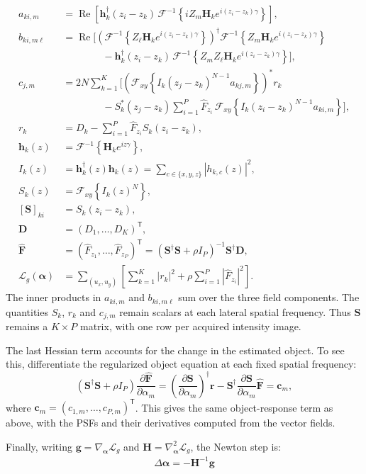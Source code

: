 \documentclass{article}
\begin{document}
\begin{align*}
a_{ki,m}
&=
\operatorname{Re}\left[
\mathbf h_k^\dagger(z_i-z_k)\,
\mathcal F^{-1}
\left\{
iZ_m\mathbf H_k e^{i(z_i-z_k)\gamma}
\right\}
\right],
\\[6pt]
b_{ki,m\ell}
&=
\operatorname{Re}\Bigg[
\left(
\mathcal F^{-1}
\left\{
Z_\ell\mathbf H_k e^{i(z_i-z_k)\gamma}
\right\}
\right)^\dagger
\mathcal F^{-1}
\left\{
Z_m\mathbf H_k e^{i(z_i-z_k)\gamma}
\right\}
\\
&\qquad\qquad-
\mathbf h_k^\dagger(z_i-z_k)\,
\mathcal F^{-1}
\left\{
Z_mZ_\ell\mathbf H_k e^{i(z_i-z_k)\gamma}
\right\}
\Bigg],
\\[6pt]
c_{j,m}
&=
2N\sum_{k=1}^{K}\Bigg[
\left(
\mathcal F_{xy}
\left\{
I_k(z_j-z_k)^{N-1}a_{kj,m}
\right\}
\right)^*r_k
\\
&\qquad\qquad-
S_k^*(z_j-z_k)
\sum_{i=1}^{P}\widehat F_{z_i}\,
\mathcal F_{xy}
\left\{
I_k(z_i-z_k)^{N-1}a_{ki,m}
\right\}
\Bigg],
\\[6pt]
r_k
&=
D_k-\sum_{i=1}^{P}\widehat F_{z_i}S_k(z_i-z_k),
\\[6pt]
\mathbf h_k(z)
&=
\mathcal F^{-1}\left\{\mathbf H_k e^{iz\gamma}\right\},
\\[6pt]
I_k(z)
&=
\mathbf h_k^\dagger(z)\mathbf h_k(z)
=\sum_{c\in\{x,y,z\}}|h_{k,c}(z)|^2,
\\[6pt]
S_k(z)
&=
\mathcal F_{xy}\left\{I_k(z)^N\right\},
\\[6pt]
[\mathbf S]_{ki}
&=
S_k(z_i-z_k),
\\[6pt]
\mathbf D
&=
(D_1,\ldots,D_K)^{\mathsf T},
\\[6pt]
\widehat{\mathbf F}
&=
(\widehat F_{z_1},\ldots,\widehat F_{z_P})^{\mathsf T}
=
\left(\mathbf S^\dagger\mathbf S+\rho I_P\right)^{-1}
\mathbf S^\dagger\mathbf D,
\\[6pt]
\mathcal{L}_g(\bm{\alpha})
&=
\sum_{(u_x,u_y)}
\left[
\sum_{k=1}^{K}|r_k|^2
+\rho\sum_{i=1}^{P}|\widehat F_{z_i}|^2
\right].
\end{align*}
The inner products in $a_{ki,m}$ and $b_{ki,m\ell}$ sum over the three field components. The quantities $S_k$, $r_k$ and $c_{j,m}$ remain scalars at each lateral spatial frequency. Thus $\mathbf S$ remains a $K\times P$ matrix, with one row per acquired intensity image.

The last Hessian term accounts for the change in the estimated object. To see this, differentiate the regularized object equation at each fixed spatial frequency:
\begin{equation}
\left(\mathbf S^\dagger\mathbf S+\rho I_P\right)
\frac{\partial\widehat{\mathbf F}}{\partial\alpha_m}
=
\left(\frac{\partial\mathbf S}{\partial\alpha_m}\right)^\dagger\mathbf r
-\mathbf S^\dagger\frac{\partial\mathbf S}{\partial\alpha_m}\widehat{\mathbf F}
=\mathbf c_m,
\end{equation}
where $\mathbf c_m=(c_{1,m},\ldots,c_{P,m})^{\mathsf T}$. This gives the same object-response term as above, with the PSFs and their derivatives computed from the vector fields.

Finally, writing $\mathbf g=\nabla_{\bm\alpha}\mathcal L_g$ and $\mathbf H=\nabla_{\bm\alpha}^2\mathcal L_g$, the Newton step is:
\begin{align}
\Delta \mathbf{\alpha} = -\mathbf{H}^{-1} \mathbf{g}
\end{align}
\end{document}
